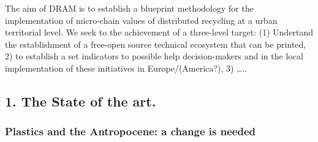 \documentclass[
  11pt,
  a4paperpaper,
  onecolumn]{article}
\begin{document}
\begin{tcolorbox}[enhanced jigsaw, titlerule=0mm, arc=.35mm, coltitle=black, colframe=quarto-callout-note-color-frame, breakable, colback=white, colbacktitle=quarto-callout-note-color!10!white, opacitybacktitle=0.6, left=2mm, bottomrule=.15mm, leftrule=.75mm, bottomtitle=1mm, toptitle=1mm, title=\textcolor{quarto-callout-note-color}{\faInfo}\hspace{0.5em}{DRAM in a nutshell}, opacityback=0, rightrule=.15mm, toprule=.15mm]
The aim of DRAM is to establish a blueprint methodology for the
implementation of micro-chain values of distributed recycling at a urban
territorial level. We seek to the achievement of a three-level target:
(1) Undertand the establishment of a free-open source technical
ecosystem that can be printed, 2) to establish a set indicators to
possible help decision-makers and in the local implementation of these
initiatives in Europe/(America?), 3) \ldots..
\end{tcolorbox}

\hypertarget{the-state-of-the-art.}{%
\subsection{1. The State of the art.}\label{the-state-of-the-art.}}

\linenumbers

\hypertarget{plastics-and-the-antropocene-a-change-is-needed}{%
\subsubsection{Plastics and the Antropocene: a change is
needed}\label{plastics-and-the-antropocene-a-change-is-needed}}
\end{document}
